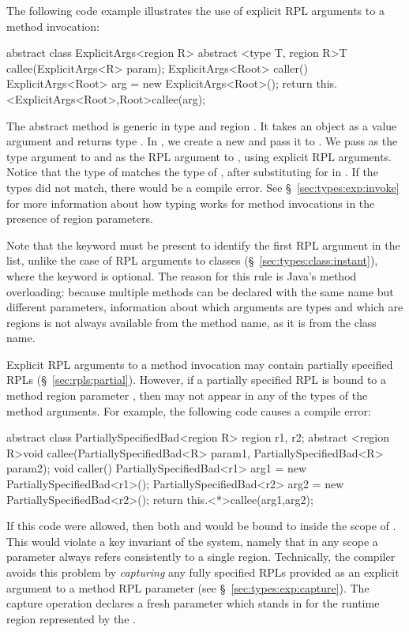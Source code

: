 The following code example illustrates the use of explicit RPL
arguments to a method invocation:
%
\begin{dpjlisting}
abstract class ExplicitArgs<region R> {
  abstract <type T, region R>T callee(ExplicitArgs<R> param);
  ExplicitArgs<Root> caller() {
    ExplicitArgs<Root> arg = new ExplicitArgs<Root>();
    return this.<ExplicitArgs<Root>,Root>callee(arg);
  }
}
\end{dpjlisting}
%
The abstract method  is generic in type  and
region .  It takes an  object as a value
argument and returns type .  In , we create
a new  and pass it to .  We
pass  as the type argument to  and
 as the RPL argument to , using explicit RPL
arguments.  Notice that the type of  matches the type of
, after substituting  for  in .
If the types did not match, there would be a compile error.  See
\S~\ref{sec:types:exp:invoke} for more information about how typing
works for method invocations in the presence of region parameters.

Note that the keyword  must be present to identify the
first RPL argument in the list, unlike the case of RPL arguments to
classes (\S~\ref{sec:types:class:instant}), where the 
keyword is optional.  The reason for this rule is Java's method
overloading: because multiple methods can be declared with the same
name but different parameters, information about which arguments are
types and which are regions is not always available from the method
name, as it is from the class name.

 Explicit RPL
arguments to a method invocation may contain partially specified RPLs
(\S~\ref{sec:rpls:partial}).  However, if a partially specified RPL is
bound to a method region parameter , then  may not
appear in any of the types of the method arguments.  For example, the
following code causes a compile error:
%
\begin{dpjlisting}
abstract class PartiallySpecifiedBad<region R> {
  region r1, r2;
  abstract <region R>void callee(PartiallySpecifiedBad<R> param1,
                                 PartiallySpecifiedBad<R> param2);
  void caller() {
    PartiallySpecifiedBad<r1> arg1 = new PartiallySpecifiedBad<r1>();
    PartiallySpecifiedBad<r2> arg2 = new PartiallySpecifiedBad<r2>();
    return this.<*>callee(arg1,arg2);
  }
}
\end{dpjlisting}
%
If this code were allowed, then both  and  would be
bound to  inside the scope of .  This would violate
a key invariant of the system, namely that in any scope a parameter
 always refers consistently to a single region.  Technically,
the compiler avoids this problem by \emph{capturing} any fully
specified RPLs provided as an explicit argument to a method RPL
parameter (see \S~\ref{sec:types:exp:capture}).  The capture operation
declares a fresh parameter which stands in for the runtime region
represented by the \kwd{*}.

